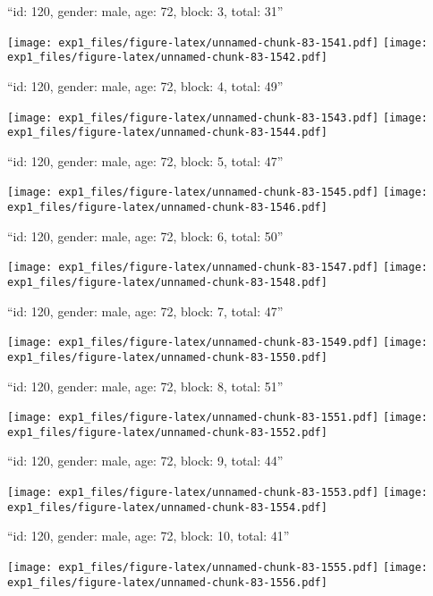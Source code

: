 \documentclass[11pt,,]{article}
\begin{document}
\newpage
[1] 

``id: 120, gender: male, age: 72, block: 3, total: 31''

\texttt{[image: exp1\_files/figure-latex/unnamed-chunk-83-1541.pdf]}
\texttt{[image: exp1\_files/figure-latex/unnamed-chunk-83-1542.pdf]}

\newpage
[1] 

``id: 120, gender: male, age: 72, block: 4, total: 49''

\texttt{[image: exp1\_files/figure-latex/unnamed-chunk-83-1543.pdf]}
\texttt{[image: exp1\_files/figure-latex/unnamed-chunk-83-1544.pdf]}

\newpage
[1] 

``id: 120, gender: male, age: 72, block: 5, total: 47''

\texttt{[image: exp1\_files/figure-latex/unnamed-chunk-83-1545.pdf]}
\texttt{[image: exp1\_files/figure-latex/unnamed-chunk-83-1546.pdf]}

\newpage
[1] 

``id: 120, gender: male, age: 72, block: 6, total: 50''

\texttt{[image: exp1\_files/figure-latex/unnamed-chunk-83-1547.pdf]}
\texttt{[image: exp1\_files/figure-latex/unnamed-chunk-83-1548.pdf]}

\newpage
[1] 

``id: 120, gender: male, age: 72, block: 7, total: 47''

\texttt{[image: exp1\_files/figure-latex/unnamed-chunk-83-1549.pdf]}
\texttt{[image: exp1\_files/figure-latex/unnamed-chunk-83-1550.pdf]}

\newpage
[1] 

``id: 120, gender: male, age: 72, block: 8, total: 51''

\texttt{[image: exp1\_files/figure-latex/unnamed-chunk-83-1551.pdf]}
\texttt{[image: exp1\_files/figure-latex/unnamed-chunk-83-1552.pdf]}

\newpage
[1] 

``id: 120, gender: male, age: 72, block: 9, total: 44''

\texttt{[image: exp1\_files/figure-latex/unnamed-chunk-83-1553.pdf]}
\texttt{[image: exp1\_files/figure-latex/unnamed-chunk-83-1554.pdf]}

\newpage
[1] 

``id: 120, gender: male, age: 72, block: 10, total: 41''

\texttt{[image: exp1\_files/figure-latex/unnamed-chunk-83-1555.pdf]}
\texttt{[image: exp1\_files/figure-latex/unnamed-chunk-83-1556.pdf]}
\end{document}
